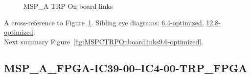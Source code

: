 \begin{figure}[h]
\begin{subfigure}{0.25\textwidth}
\hyperref[sec:MSPAFPGAIC3924IC424TRPFPGA9.6-optimized]{}
\end{subfigure}\hspace*{\fill}
\begin{subfigure}{0.25\textwidth}
\hyperref[sec:MSPAFPGAIC3925IC425TRPFPGA9.6-optimized]{}
\end{subfigure}\hspace*{\fill}
\begin{subfigure}{0.25\textwidth}
\hyperref[sec:MSPAFPGAIC3926IC426TRPFPGA9.6-optimized]{}
\end{subfigure}\hspace*{\fill}
\begin{subfigure}{0.25\textwidth}
\hyperref[sec:MSPAFPGAIC3927IC427TRPFPGA9.6-optimized]{}
\end{subfigure}

\caption{MSP\_A TRP On board links} \label{fig:MSPATRPOnboardlinks9.6-optimized}
\end{figure}

A cross-reference to Figure~\ref{fig:MSPATRPOnboardlinks9.6-optimized}.
Sibling eye diagrams: \hyperref[sec:MSPATRPOnboardlinks6.4-optimized]{6.4-optimized}, \hyperref[sec:MSPATRPOnboardlinks12.8-optimized]{12.8-optimized}. \\
Next summary Figure~\ref{fig:MSPCTRPOnboardlinks9.6-optimized}.
\clearpage
% 
\subsection{MSP\_A\_FPGA-IC39-00--IC4-00-TRP\_FPGA}\label{sec:MSPAFPGAIC3900IC400TRPFPGA9.6-optimized}

